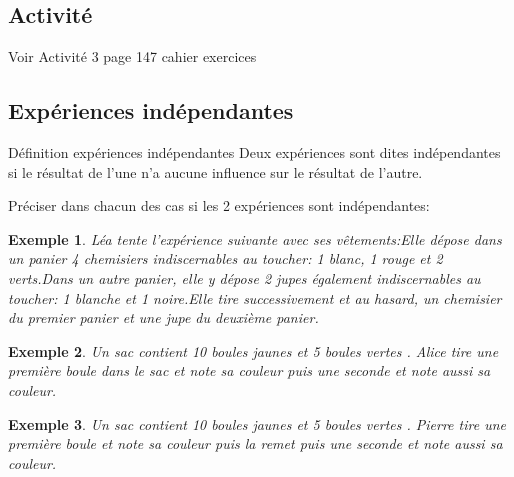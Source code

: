 \documentclass[10pt,a4paper]{article}
\theoremstyle{break}
\newtheorem{Ex}{Exemple}
\begin{document}
	\subsection{Activité}
Voir Activité 3 page 147 cahier exercices
	\subsection{Expériences indépendantes}
		\begin{bclogo}[couleur = yellow!30,arrondi =0.1,logo =\bcbook]{Définition expériences indépendantes} 
			Deux expériences sont dites indépendantes si le résultat de l’une n’a aucune influence sur le résultat de l’autre.
			
			\end{bclogo}
		Préciser dans chacun des cas si les 2 expériences sont indépendantes:
		\begin{Ex}
			Léa tente l’expérience suivante avec ses vêtements:Elle dépose dans un panier 4 chemisiers indiscernables au toucher: 1 blanc, 1 rouge et 2 verts.Dans un autre panier, elle y dépose 2 jupes également indiscernables au toucher: 1 blanche et 1 noire.Elle tire successivement et au hasard, un chemisier du premier panier et une jupe du deuxième panier.	
		\end{Ex}
	\begin{Ex}
		Un sac contient 10 boules jaunes et 5 boules vertes . Alice tire une première boule dans le sac  et note sa couleur puis une seconde et note aussi sa couleur.
	\end{Ex}
	\begin{Ex}
	Un sac contient 10 boules jaunes et 5 boules vertes . Pierre tire une première boule et note sa couleur puis la remet puis une seconde et note aussi sa couleur.
\end{Ex}
\end{document}
